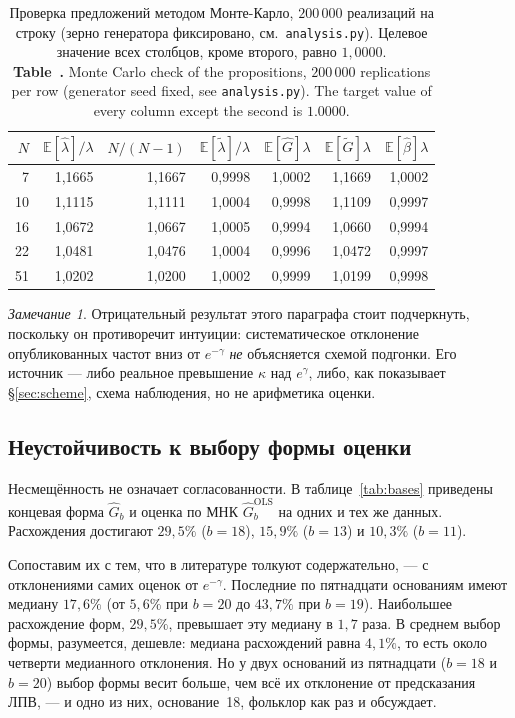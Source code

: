 \documentclass[11pt,a4paper]{article}
\newcommand{\encaptab}[1]{\\[3pt]\foreignlanguage{english}{%
  \textbf{Table~\thetable.} #1}}
\theoremstyle{plain}
\theoremstyle{remark}
\newtheorem{remark}{Замечание}
\newcommand{\eg}{e^{\gamma}}
\newcommand{\emg}{e^{-\gamma}}
\begin{document}
\begin{table}[t]
\centering
\caption{Проверка предложений методом Монте-Карло, $200\,000$ реализаций на строку
(зерно генератора фиксировано, см.\ \texttt{analysis.py}).
Целевое значение всех столбцов, кроме второго, равно $1{,}0000$.
\encaptab{Monte Carlo check of the propositions, $200\,000$ replications per row
(generator seed fixed, see \texttt{analysis.py}). The target value of every column
except the second is $1.0000$.}}
\label{tab:mc}
\small
\begin{tabular}{rrrrrrr}
\toprule
$N$ & $\mathbb E[\hat\lambda]/\lambda$ & $N/(N-1)$ & $\mathbb E[\tilde\lambda]/\lambda$
& $\mathbb E[\hat G]\lambda$ & $\mathbb E[\tilde G]\lambda$ & $\mathbb E[\hat\beta]\lambda$\\
\midrule
7 & 1{,}1665 & 1{,}1667 & 0{,}9998 & 1{,}0002 & 1{,}1669 & 1{,}0002\\
10 & 1{,}1115 & 1{,}1111 & 1{,}0004 & 0{,}9998 & 1{,}1109 & 0{,}9997\\
16 & 1{,}0672 & 1{,}0667 & 1{,}0005 & 0{,}9994 & 1{,}0660 & 0{,}9994\\
22 & 1{,}0481 & 1{,}0476 & 1{,}0004 & 0{,}9996 & 1{,}0472 & 0{,}9997\\
51 & 1{,}0202 & 1{,}0200 & 1{,}0002 & 0{,}9999 & 1{,}0199 & 0{,}9998\\
\bottomrule
\end{tabular}
\end{table}

\begin{remark}
Отрицательный результат этого параграфа стоит подчеркнуть, поскольку он противоречит
интуиции: систематическое отклонение опубликованных частот вниз от $\emg$
\emph{не} объясняется схемой подгонки. Его источник --- либо реальное превышение
$\kappa$ над $\eg$, либо, как показывает \S\ref{sec:scheme}, схема наблюдения,
но не арифметика оценки.
\end{remark}

\subsection{Неустойчивость к выбору формы оценки}\label{sec:instability}

Несмещённость не означает согласованности. В таблице~\ref{tab:bases} приведены
концевая форма $\hat G_b$ и оценка по МНК $\hat G_b^{\mathrm{OLS}}$ на одних и тех же
данных. Расхождения достигают $29{,}5\%$ ($b=18$), $15{,}9\%$ ($b=13$) и $10{,}3\%$
($b=11$).

Сопоставим их с тем, что в литературе толкуют содержательно, --- с отклонениями
самих оценок от $\emg$. Последние по пятнадцати основаниям имеют медиану $17{,}6\%$
(от $5{,}6\%$ при $b=20$ до $43{,}7\%$ при $b=19$). Наибольшее расхождение форм,
$29{,}5\%$, превышает эту медиану в $1{,}7$ раза. В среднем выбор формы, разумеется,
дешевле: медиана расхождений равна $4{,}1\%$, то есть около четверти медианного
отклонения. Но у двух оснований из пятнадцати ($b=18$ и $b=20$) выбор формы весит
больше, чем всё их отклонение от предсказания ЛПВ, --- и одно из них, основание~18,
фольклор как раз и обсуждает.
\end{document}
